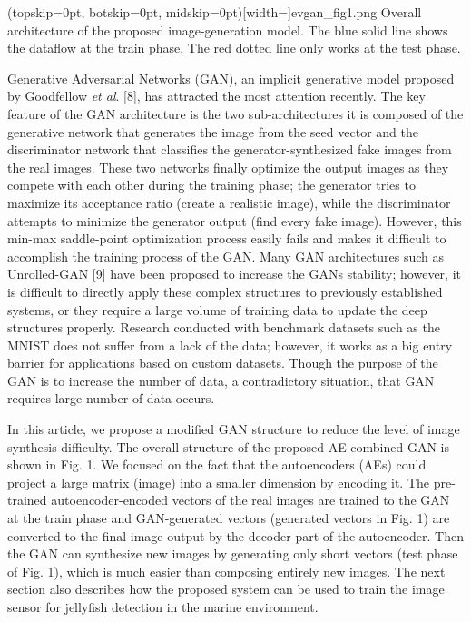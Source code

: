 \documentclass{ieeeaccess}
\begin{document}
\Figure[t](topskip=0pt, botskip=0pt, midskip=0pt)[width=\linewidth]{evgan_fig1.png}
{Overall architecture of the proposed image-generation model. The blue solid line shows the dataflow at the train phase. The red dotted line only works at the test phase.\label{fig1}}

Generative Adversarial Networks (GAN), an implicit generative model proposed by Goodfellow \textit{et al}. [8], has attracted the most attention recently. The key feature of the GAN architecture is the two sub-architectures it is composed of the generative network that generates the image from the seed vector and the discriminator network that classifies the generator-synthesized fake images from the real images. These two networks finally optimize the output images as they compete with each other during the training phase; the generator tries to maximize its acceptance ratio (create a realistic image), while the discriminator attempts to minimize the generator output (find every fake image). However, this min-max saddle-point optimization process easily fails and makes it difficult to accomplish the training process of the GAN. Many GAN architectures such as Unrolled-GAN [9] have been proposed to increase the GAN\textquotesingle s stability; however, it is difficult to directly apply these complex structures to previously established systems, or they require a large volume of training data to update the deep structures properly. Research conducted with benchmark datasets such as the MNIST does not suffer from a lack of the data; however, it works as a big entry barrier for applications based on custom datasets. Though the purpose of the GAN is to increase the number of data, a contradictory situation, that GAN requires large number of data occurs.

In this article, we propose a modified GAN structure to reduce the level of image synthesis difficulty. The overall structure of the proposed AE-combined GAN is shown in Fig. 1. We focused on the fact that the autoencoders (AEs) could project a large matrix (image) into a smaller dimension by encoding it. The pre-trained autoencoder-encoded vectors of the real images are trained to the GAN at the train phase and GAN-generated vectors (generated vectors in Fig. 1) are converted to the final image output by the decoder part of the autoencoder. Then the GAN can synthesize new images by generating only short vectors (test phase of Fig. 1), which is much easier than composing entirely new images. The next section also describes how the proposed system can be used to train the image sensor for jellyfish detection in the marine environment.
\end{document}
